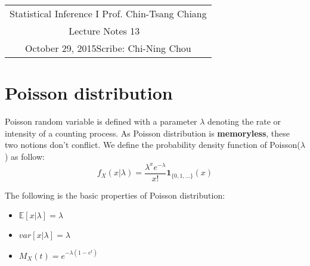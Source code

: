\documentclass[11pt]{article}
\newcommand{\scribe}{Chi-Ning Chou}
\newcommand{\lecnum}{13}
\newcommand{\lecdate}{October 29, 2015}
\begin{document}
	
	\begin{center}
		\renewcommand{\arraystretch}{2}
		\begin{bfseries}
			\begin{tabular}{|c|}
				\hline
				Statistical Inference I \hfill Prof. Chin-Tsang Chiang\\
				\hspace{15em} {\large Lecture Notes \lecnum} \hspace{15em}\ \\
				\lecdate \hfill Scribe: \scribe\\
				\hline
			\end{tabular}
			\renewcommand{\arraystretch}{1}
		\end{bfseries}
	\end{center}
	
\section{Poisson distribution}
Poisson random variable is defined with a parameter $\lambda$ denoting the rate or intensity of a counting process. As Poisson distribution is {\bf memoryless}, these two notions don't conflict. We define the probability density function of Poisson($\lambda$) as follow:
$$f_X(x|\lambda) = \frac{\lambda^x e^{-\lambda}}{x!}\mathbf{1}_{\{0,1,...\}}(x)$$

\noindent The following is the basic properties of Poisson distribution:
\begin{itemize}
	\item $\mathbb{E}[x|\lambda] = \lambda$
	\item $var[x|\lambda]=\lambda$
	\item $M_X(t) = e^{-\lambda(1-e^t)}$
\end{itemize}
\end{document}
